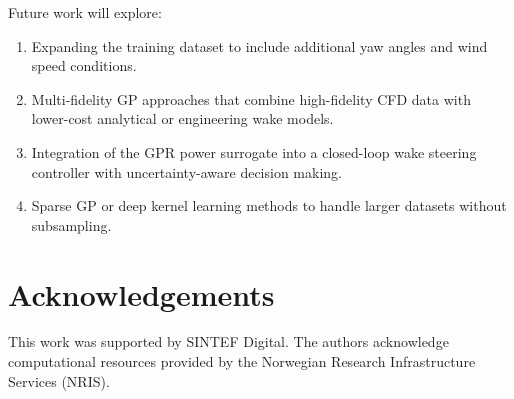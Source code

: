 \documentclass[12pt]{article}
\begin{document}
Future work will explore:
\begin{enumerate}
    \item Expanding the training dataset to include additional yaw angles and wind speed conditions.
    \item Multi-fidelity GP approaches that combine high-fidelity CFD data with lower-cost analytical or engineering wake models.
    \item Integration of the GPR power surrogate into a closed-loop wake steering controller with uncertainty-aware decision making.
    \item Sparse GP or deep kernel learning methods to handle larger datasets without subsampling.
\end{enumerate}


\section*{Acknowledgements}
This work was supported by SINTEF Digital. The authors acknowledge computational resources provided by the Norwegian Research Infrastructure Services (NRIS).



\end{document}
